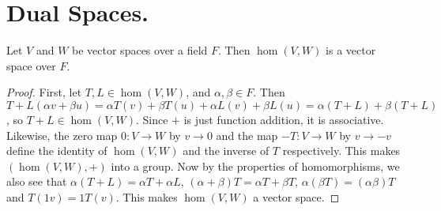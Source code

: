 
\section{Dual Spaces.}
\label{section1}

\begin{lemma}\label{1.3.1}
    Let $V$ and  $W$ be vector spaces over a field  $F$. Then  $\hom(V,W)$ is a
    vector space over $F$.
\end{lemma}
\begin{proof}
    First, let $T,L \in \hom(V,W)$, and $\alpha, \beta \in F$. Then  $T+L(\alpha
    v+ \beta u)=\alpha T(v)+\beta T(u)+\alpha L(v)+\beta
    L(u)=\alpha(T+L)+\beta(T+L)$, so $T+L \in \hom(V,W)$. Since $+$ is just
    function addition, it is associative. Likewise, the zero map  $0:V
    \rightarrow W$ by $v \rightarrow 0$ and the map $-T:V \rightarrow W$ by $v
    \rightarrow -v$ define the identity of $\hom(V,W)$ and the inverse of $T$
    respectively. This makes  $(\hom(V,W),+)$ into a group. Now by the
    properties of homomorphisms, we also see that $\alpha(T+L)=\alpha T+\alpha
    L$, $(\alpha+\beta)T=\alpha T+\beta T$, $\alpha(\beta T)=(\alpha\beta)T$ and
    $T(1v)=1T(v)$. This makes $\hom(V,W)$ a vector space.
\end{proof}

